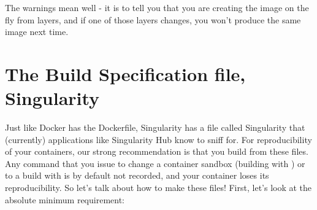 \documentclass[letterpaper,10pt,english]{sphinxmanual}
\begin{document}
\begin{sphinxVerbatim}[commandchars=\\\{\}]
 

 

 

             

      

  

 

   
\end{sphinxVerbatim}

The warnings mean well - it is to tell you that you are creating the
image on the fly from layers, and if one of those layers changes, you
won’t produce the same image next time.


\section{The Build Specification file, Singularity}
\label{\detokenize{singularity_and_docker:the-build-specification-file-singularity}}
Just like Docker has the Dockerfile, Singularity has a file called
Singularity that (currently) applications like Singularity Hub know to
sniff for. For reproducibility of your containers, our strong
recommendation is that you build from these files. Any command that you
issue to change a container sandbox (building with  ) or to a build with 
is by default not recorded, and your container loses its
reproducibility. So let’s talk about how to make these files! First,
let’s look at the absolute minimum requirement:
\end{document}
